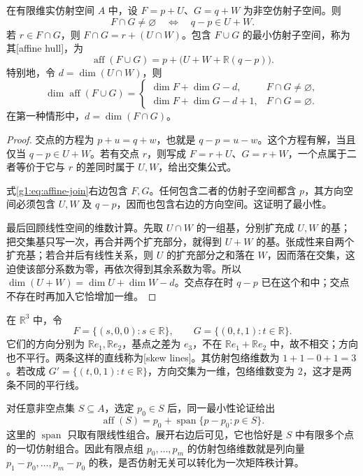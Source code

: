 \begin{proposition}\label{g1:prop:affine-intersection}
	在有限维实仿射空间 \(A\) 中，设 \(F=p+U\)、\(G=q+W\) 为非空仿射子空间。则
	\[
		F\cap G\ne\varnothing\quad\Longleftrightarrow\quad q-p\in U+W.
	\]
	若 \(r\in F\cap G\)，则 \(F\cap G=r+(U\cap W)\)。包含 \(F\cup G\) 的最小仿射子空间，称为其[affine hull]，为
	\begin{equation}\label{g1:eq:affine-join}
		\operatorname{aff}(F\cup G)=p+\bigl(U+W+\mathbb R(q-p)\bigr).
	\end{equation}
	特别地，令 \(d=\dim(U\cap W)\)，则
	\[
		\dim\operatorname{aff}(F\cup G)
		=\begin{cases}
			\dim F+\dim G-d,&F\cap G\ne\varnothing,\\
			\dim F+\dim G-d+1,&F\cap G=\varnothing.
		\end{cases}
	\]
	在第一种情形中，\(d=\dim(F\cap G)\)。
\end{proposition}
\begin{proof}
	交点的方程为 \(p+u=q+w\)，也就是 \(q-p=u-w\)。这个方程有解，当且仅当 \(q-p\in U+W\)。若有交点 \(r\)，则写成 \(F=r+U\)、\(G=r+W\)，一个点属于二者等价于它与 \(r\) 的差同时属于 \(U,W\)，给出交集公式。

	式\eqref{g1:eq:affine-join}右边包含 \(F,G\)。任何包含二者的仿射子空间都含 \(p\)，其方向空间必须包含 \(U,W\) 及 \(q-p\)，因而也包含右边的方向空间。这证明了最小性。

	最后回顾线性空间的维数计算。先取 \(U\cap W\) 的一组基，分别扩充成 \(U,W\) 的基；把交集基只写一次，再合并两个扩充部分，就得到 \(U+W\) 的基。张成性来自两个扩充基；若合并后有线性关系，则 \(U\) 的扩充部分之和落在 \(W\)，因而落在交集，这迫使该部分系数为零，再依次得到其余系数为零。所以 \(\dim(U+W)=\dim U+\dim W-d\)。交点存在时 \(q-p\) 已在这个和中；交点不存在时再加入它恰增加一维。
\end{proof}

\begin{example}\label{g1:exm:skew-lines}
	在 \(\mathbb R^3\) 中，令
	\[
		F=\{(s,0,0):s\in\mathbb R\},\qquad
		G=\{(0,t,1):t\in\mathbb R\}.
	\]
	它们的方向分别为 \(\mathbb Re_1,\mathbb Re_2\)，基点之差为 \(e_3\)，不在 \(\mathbb Re_1+\mathbb Re_2\) 中，故不相交；方向也不平行。两条这样的直线称为[skew lines]。其仿射包络维数为 \(1+1-0+1=3\)。若改成 \(G'=\{(t,0,1):t\in\mathbb R\}\)，方向交集为一维，包络维数变为 \(2\)，这才是两条不同的平行线。
\end{example}

对任意非空点集 \(S\subseteq A\)，选定 \(p_0\in S\) 后，同一最小性论证给出
\[
	\operatorname{aff}(S)=p_0+\operatorname{span}\{p-p_0:p\in S\}.
\]
这里的 \(\operatorname{span}\) 只取有限线性组合。展开右边后可见，它也恰好是 \(S\) 中有限多个点的一切仿射组合。因此有限点组 \(p_0,\ldots,p_m\) 的仿射包络维数就是列向量 \(p_1-p_0,\ldots,p_m-p_0\) 的秩，是否仿射无关可以转化为一次矩阵秩计算。
